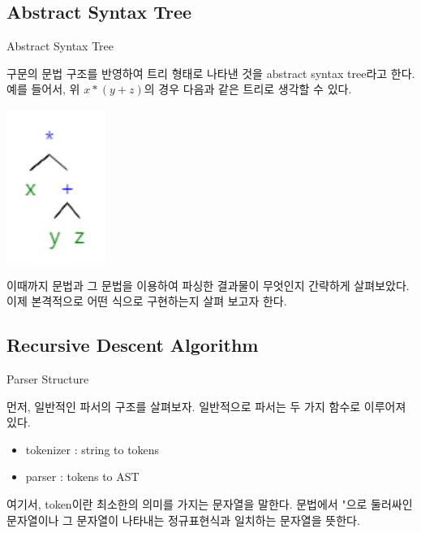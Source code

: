 \documentclass{beamer}
\begin{document}
\subsection{Abstract Syntax Tree} 

\begin{frame}{Abstract Syntax Tree} 

구문의 문법 구조를 반영하여 트리 형태로 나타낸 것을 abstract syntax tree라고 한다. 예를 들어서, 위 $x*(y+z)$의 경우 다음과 같은 트리로 생각할 수 있다. 

\includegraphics[height=5cm,keepaspectratio]{ast}

이때까지 문법과 그 문법을 이용하여 파싱한 결과물이 무엇인지 간략하게 살펴보았다. 이제 본격적으로 어떤 식으로 구현하는지 살펴 보고자 한다. 

\end{frame}


\subsection{Recursive Descent Algorithm}

\begin{frame}{Parser Structure} 

먼저, 일반적인 파서의 구조를 살펴보자. 일반적으로 파서는 두 가지 함수로 이루어져 있다. 

\begin{itemize} 
\item tokenizer : string to tokens
\item parser : tokens to AST
\end{itemize}

여기서, token이란 최소한의 의미를 가지는 문자열을 말한다. 문법에서 "으로 둘러싸인 문자열이나 그 문자열이 나타내는 정규표현식과 일치하는 문자열을 뜻한다. 

\end{frame}
\end{document}
